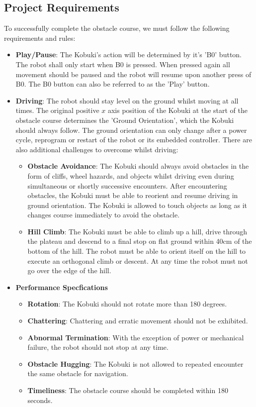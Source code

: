 \subsection{Project Requirements}\label{sec:requirements}
To successfully complete the obstacle course, we must follow the following requirements and rules:
\begin{itemize}
    \item \textbf{Play/Pause}: 
    The Kobuki's action will be determined by it's 'B0' button. The robot shall only start when B0 is pressed. When pressed again all movement should be paused and the robot will resume upon another press of B0. The B0 button can also be referred to as the 'Play' button.
    \item \textbf{Driving}:
    The robot should stay level on the ground whilst moving at all times. The original positive $x$ axis position of the Kobuki at the start of the obstacle course determines the 'Ground Orientation', which the Kobuki should always follow. The ground orientation can only change after a power cycle, reprogram or restart of the robot or its embedded controller. There are also additional challenges to overcome whilst driving:
    \begin{itemize}
        \item \textbf{Obstacle Avoidance}:
        The Kobuki should always avoid obstacles in the form of cliffs, wheel hazards, and objects whilst driving even during simultaneous or shortly successive encounters. After encountering obstacles, the Kobuki must be able to reorient and resume driving in ground orientation. The Kobuki is allowed to touch objects as long as it changes course immediately to avoid the obstacle. 
        \item \textbf{Hill Climb}:
        The Kobuki must be able to climb up a hill, drive through the plateau and descend to a final stop on flat ground within 40cm of the bottom of the hill. The robot must be able to orient itself on the hill to execute an orthogonal climb or descent. At any time the robot must not go over the edge of the hill.
    \end{itemize}
    \item \textbf{Performance Specfications}
    \begin{itemize}
        \item \textbf{Rotation}: The Kobuki should not rotate more than 180 degrees.
        \item \textbf{Chattering}: Chattering and erratic movement should not be exhibited.
        \item \textbf{Abnormal Termination}: With the exception of power or mechanical failure, the robot should not stop at any time.
        \item \textbf{Obstacle Hugging}: The Kobuki is not allowed to repeated encounter the same obstacle for navigation.
        \item \textbf{Timeliness}: The obstacle course should be completed within 180 seconds.
    \end{itemize}
\end{itemize}